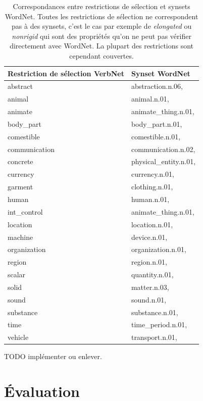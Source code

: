 \begin{table}[ht]
\centering
\begin{tabular}{ll}
    \toprule
        Restriction de sélection VerbNet & Synset WordNet \\
    \midrule
        abstract & abstraction.n.06, \\
        animal & animal.n.01, \\
        animate & animate\_thing.n.01, \\
        body\_part & body\_part.n.01, \\
        comestible & comestible.n.01, \\
        communication & communication.n.02, \\
        concrete & physical\_entity.n.01, \\
        currency & currency.n.01, \\
        garment & clothing.n.01, \\
        human & human.n.01, \\
        int\_control & animate\_thing.n.01, \\
        location & location.n.01, \\
        machine & device.n.01, \\
        organization & organization.n.01, \\
        region & region.n.01, \\
        scalar & quantity.n.01, \\
        solid & matter.n.03, \\
        sound & sound.n.01, \\
        substance & substance.n.01, \\
        time & time\_period.n.01, \\
        vehicle & transport.n.01, \\
  \bottomrule
\end{tabular}

\caption{\label{table:mapping_verbnetrestr_wordnet}Correspondances entre
restrictions de sélection et synsets WordNet. Toutes les restrictions de
sélection ne correspondent pas à des synsets, c'est le cas par exemple de
\textit{elongated} ou \textit{nonrigid} qui sont des propriétés qu'on ne peut pas
vérifier directement avec WordNet. La plupart des restrictions sont cependant
couvertes.}
\end{table}

TODO implémenter ou enlever.

\section{Évaluation}
\label{srl:evaluation}

